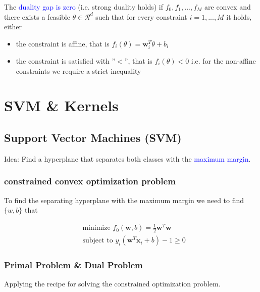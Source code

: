 \documentclass[a4paper,10pt,twoside=true,DIV=10,headsepline,plainheadsepline]{scrartcl}
\begin{document}
		The \textcolor{blue}{duality gap is zero} (i.e. strong duality holds) if $f_0, f_1, ... , f_M$ are convex and there exists a feasible $\theta \in \mathcal{R}^d$ such that for every constraint $i = 1, ..., M$ it holds, either
		\begin{itemize}
			\item the constraint is affine, that is $f_i (\theta) = \mathbf{w}_i^T \theta + b_i$
			\item the constraint is satisfied with ”$<$”, that is $f_i (\theta) < 0$ i.e. for the non-affine constraints we require a strict inequality
		\end{itemize}
			
				
	\section{SVM \& Kernels}
		\subsection{Support Vector Machines (SVM)}
			Idea: Find a hyperplane that separates both classes with the \textcolor{blue}{maximum margin}. 

		\subsubsection{constrained convex optimization problem}
			To find the separating hyperplane with the maximum margin we need to
find $\{w, b\}$ that

			\begin{align}
				&\textrm{minimize }  f_0(\mathbf{w}, b) = \frac{1}{2} \mathbf{w}^T \mathbf{w} \\
				&\textrm{subject to } y_i (\mathbf{w}^T \mathbf{x}_i + b) - 1 \geq 0
			\end{align}

		\subsubsection{Primal Problem \& Dual Problem}
		Applying the recipe for solving the constrained optimization problem.
		
\end{document}
